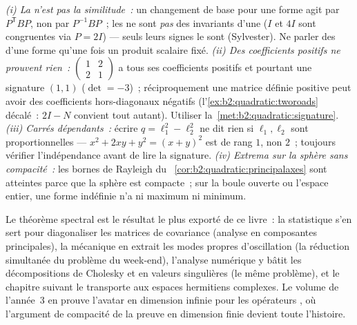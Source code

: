 \begin{remark}
\emph{(i) La  n'est pas la similitude~:} un changement de
base pour une forme agit par $P^{\mathsf T}BP$, non par $P^{-1}BP$~;
les  ne sont \emph{pas} des invariants d'une  ($I$ et $4I$ sont congruentes via $P = 2I$) --- seuls
leurs signes le sont (Sylvester). Ne parler des 
d'une forme qu'une fois un produit scalaire fixé. \emph{(ii) Des
coefficients positifs ne prouvent rien~:} $\begin{pmatrix} 1 & 2\\ 2
& 1\end{pmatrix}$ a tous ses coefficients positifs et pourtant une
signature $(1,1)$ ($\det = -3$)~; réciproquement une matrice définie
positive peut avoir des coefficients hors-diagonaux négatifs
(l'\cref{ex:b2:quadratic:tworoads} décalé~: $2I - N$ convient tout
autant). Utiliser la~\cref{met:b2:quadratic:signature}. \emph{(iii)
Carrés dépendants~:} écrire $q = \ell_1^2 - \ell_2^2$ ne dit rien si
$\ell_1, \ell_2$ sont proportionnelles --- $x^2 + 2xy + y^2 =
(x+y)^2$ est de rang $1$, non $2$~; toujours vérifier
l'indépendance avant de lire la signature. \emph{(iv) Extrema sur la
sphère sans compacité~:} les bornes de Rayleigh du~
\cref{cor:b2:quadratic:principalaxes} sont atteintes parce que la
sphère est compacte~; sur la boule ouverte ou l'espace entier, une
forme indéfinie n'a ni maximum ni minimum.
\end{remark}

\begin{remark}
Le théorème spectral est le résultat le plus exporté de ce livre~:
la statistique s'en sert pour diagonaliser les matrices de
covariance (analyse en composantes principales), la mécanique en
extrait les modes propres d'oscillation (la réduction simultanée du
problème du week-end), l'analyse numérique y bâtit les
décompositions de Cholesky et en valeurs singulières (le même
problème), et le chapitre suivant le transporte aux espaces
hermitiens complexes. Le volume de l'année~3 en prouve l'avatar en
dimension infinie pour les opérateurs  , où
l'argument de compacité de la preuve en dimension finie devient
toute l'histoire.
\end{remark}

